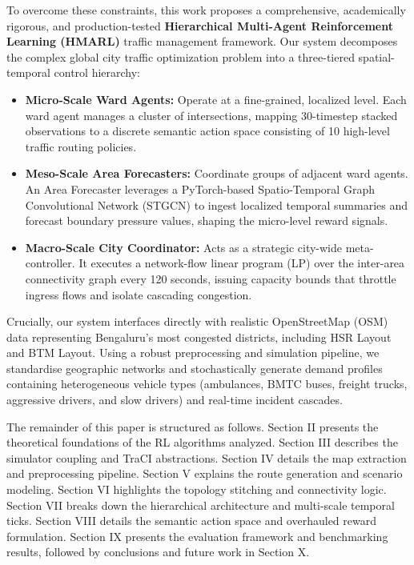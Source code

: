 \documentclass[conference]{IEEEtran}
\begin{document}
To overcome these constraints, this work proposes a comprehensive, academically rigorous, and production-tested \textbf{Hierarchical Multi-Agent Reinforcement Learning (HMARL)} traffic management framework. Our system decomposes the complex global city traffic optimization problem into a three-tiered spatial-temporal control hierarchy:
\begin{itemize}
    \item \textbf{Micro-Scale Ward Agents:} Operate at a fine-grained, localized level. Each ward agent manages a cluster of intersections, mapping 30-timestep stacked observations to a discrete semantic action space consisting of 10 high-level traffic routing policies.
    \item \textbf{Meso-Scale Area Forecasters:} Coordinate groups of adjacent ward agents. An Area Forecaster leverages a PyTorch-based Spatio-Temporal Graph Convolutional Network (STGCN) to ingest localized temporal summaries and forecast boundary pressure values, shaping the micro-level reward signals.
    \item \textbf{Macro-Scale City Coordinator:} Acts as a strategic city-wide meta-controller. It executes a network-flow linear program (LP) over the inter-area connectivity graph every 120 seconds, issuing capacity bounds that throttle ingress flows and isolate cascading congestion.
\end{itemize}

Crucially, our system interfaces directly with realistic OpenStreetMap (OSM) data representing Bengaluru's most congested districts, including HSR Layout and BTM Layout. Using a robust preprocessing and simulation pipeline, we standardise geographic networks and stochastically generate demand profiles containing heterogeneous vehicle types (ambulances, BMTC buses, freight trucks, aggressive drivers, and slow drivers) and real-time incident cascades.

The remainder of this paper is structured as follows. Section II presents the theoretical foundations of the RL algorithms analyzed. Section III describes the simulator coupling and TraCI abstractions. Section IV details the map extraction and preprocessing pipeline. Section V explains the route generation and scenario modeling. Section VI highlights the topology stitching and connectivity logic. Section VII breaks down the hierarchical architecture and multi-scale temporal ticks. Section VIII details the semantic action space and overhauled reward formulation. Section IX presents the evaluation framework and benchmarking results, followed by conclusions and future work in Section X.
\end{document}
